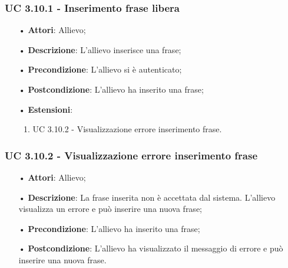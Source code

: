 \subsubsection{UC 3.10.1 - Inserimento frase libera}
\begin{itemize}
	\item[•]\textbf{Attori}: Allievo;
	\item[•]\textbf{Descrizione}: L'allievo inserisce una frase;
	\item[•]\textbf{Precondizione}: L'allievo si è autenticato;
	\item[•]\textbf{Postcondizione}: L'allievo ha inserito una frase;
	\item[•]\textbf{Estensioni}:
	\begin{enumerate}
		\item UC 3.10.2 - Visualizzazione errore inserimento frase.
	\end{enumerate}
\end{itemize}

\subsubsection{UC 3.10.2 - Visualizzazione errore inserimento frase}
\begin{itemize}
	\item[•]\textbf{Attori}: Allievo;
	\item[•]\textbf{Descrizione}: La frase inserita non è accettata dal sistema. L'allievo visualizza un errore e può inserire una nuova frase;
	\item[•]\textbf{Precondizione}: L'allievo ha inserito una frase;
	\item[•]\textbf{Postcondizione}: L'allievo ha visualizzato il messaggio di errore e può inserire una nuova frase.
\end{itemize}

